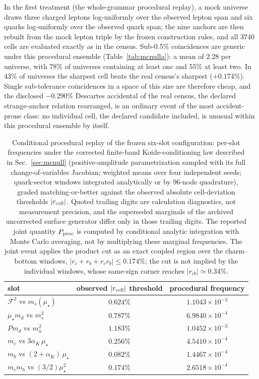\documentclass[aps,twocolumn,superscriptaddress,nofootinbib,floatfix]{revtex4-2}
\newcommand{\mstar}{\mu_\star}
\newcommand{\alphaK}{\alpha_K}
\begin{document}
In the first treatment (the whole-grammar procedural replay), a mock universe draws three
charged leptons log-uniformly over the observed lepton span and six quarks
log-uniformly over the observed quark span; the nine anchors are then rebuilt
from the mock lepton triple by the frozen construction rules, and all $3740$
cells are evaluated exactly as in the census. Sub-$0.5\%$ coincidences are
generic under this procedural ensemble (Table~\ref{tab:mcnulla}): a mean of $2.28$ per
universe, with $78\%$ of universes containing at least one and $55\%$ at
least two. In $43\%$ of universes the sharpest cell beats the real census's
sharpest ($+0.174\%$). Single sub-tolerance coincidences in a space of this
size are therefore cheap, and the disclosed $-0.290\%$ Descartes accidental
of the real census, the declared strange-anchor relation rearranged, is an ordinary event of the most accident-prone class: no
individual cell, the declared candidate included, is unusual within this procedural ensemble by itself.

\begin{table}[t]
\caption{Conditional procedural replay of the frozen six-slot configuration: per-slot frequencies under the corrected finite-band Koide-conditioning law described in Sec.~\ref{sec:mcnull} (positive-amplitude parametrization sampled with its full change-of-variables Jacobian; weighted means over four independent seeds; quark-sector windows integrated analytically or by $96$-node quadrature), graded matching-or-better against the observed absolute cell-deviation thresholds $|r_{\rm cell}|$. Quoted trailing digits are calculation diagnostics, not measurement precision, and the superseded marginals of the archived uncorrected surface generator differ only in those trailing digits. The reported joint quantity $P_{\rm proc}$ is computed by conditional analytic integration with Monte Carlo averaging, not by multiplying these marginal frequencies. The joint event applies the product cut as an exact coupled region over the charm--bottom windows, $|r_c+r_b+r_cr_b|\le0.174\%$; the cut is not implied by the individual windows, whose same-sign corner reaches $|r_{cb}|\simeq0.34\%$.}
\label{tab:slots}
\begin{ruledtabular}
\begin{tabular}{lcc}
slot & observed $|r_{\rm cell}|$ threshold & procedural frequency \\
\hline
$\mathcal{F}^2$ vs $m_s(\mstar)$ & $0.624\%$ & $1.1043\times10^{-3}$ \\
$\mstar m_d$ vs $m_s^2$ & $0.787\%$ & $6.9840\times10^{-4}$ \\
$P m_d$ vs $m_u^2$ & $1.183\%$ & $1.0452\times10^{-3}$ \\
$m_c$ vs $3\alphaK\,\mstar$ & $0.256\%$ & $4.5410\times10^{-4}$ \\
$m_b$ vs $(2+\alphaK)\,\mstar$ & $0.082\%$ & $1.4467\times10^{-4}$ \\
$m_c m_b$ vs $(3/2)\mstar^2$ & $0.174\%$ & $2.6518\times10^{-4}$ \\
\end{tabular}
\end{ruledtabular}
\end{table}
\end{document}
